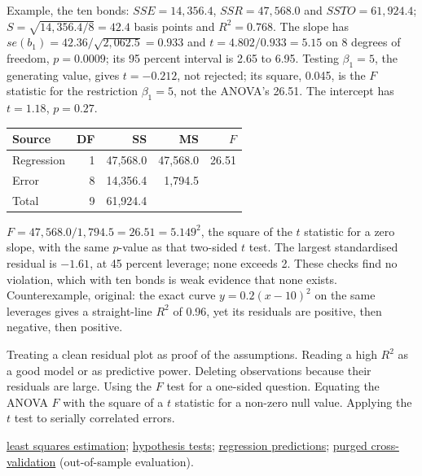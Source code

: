 \begin{qfmethod}
 Example, the ten bonds: $SSE=14{,}356.4$, $SSR=47{,}568.0$ and $SSTO=61{,}924.4$; $S=\sqrt{14{,}356.4/8}=42.4$ basis points and $R^2=0.768$. The slope has $se(b_1)=42.36/\sqrt{2{,}062.5}=0.933$ and $t=4.802/0.933=5.15$ on 8 degrees of freedom, $p=0.0009$; its 95 percent interval is 2.65 to 6.95. Testing $\beta_1=5$, the generating value, gives $t=-0.212$, not rejected; its square, 0.045, is the $F$ statistic for the restriction $\beta_1=5$, not the ANOVA's 26.51. The intercept has $t=1.18$, $p=0.27$.

\begin{center}\small
\begin{tabular}{@{}lrrrr@{}}
\toprule
Source & DF & SS & MS & $F$ \\
\midrule
Regression & 1 & 47{,}568.0 & 47{,}568.0 & 26.51 \\
Error & 8 & 14{,}356.4 & 1{,}794.5 & \\
Total & 9 & 61{,}924.4 & & \\
\bottomrule
\end{tabular}
\end{center}

$F=47{,}568.0/1{,}794.5=26.51=5.149^2$, the square of the $t$ statistic for a zero slope, with the same $p$-value as that two-sided $t$ test. The largest standardised residual is $-1.61$, at 45 percent leverage; none exceeds 2. These checks find no violation, which with ten bonds is weak evidence that none exists. Counterexample, original: the exact curve $y=0.2(x-10)^2$ on the same leverages gives a straight-line $R^2$ of 0.96, yet its residuals are positive, then negative, then positive.

 Treating a clean residual plot as proof of the assumptions. Reading a high $R^2$ as a good model or as predictive power. Deleting observations because their residuals are large. Using the $F$ test for a one-sided question. Equating the ANOVA $F$ with the square of a $t$ statistic for a non-zero null value. Applying the $t$ test to serially correlated errors.

 \hyperref[meth:simple-regression-estimation]{least squares estimation}; \hyperref[meth:hypothesis-testing]{hypothesis tests}; \hyperref[meth:regression-prediction-functional-form]{regression predictions}; \hyperref[meth:purged-embargoed-cross-validation]{purged cross-validation} (out-of-sample evaluation).

\end{qfmethod}

